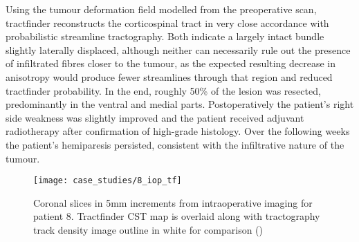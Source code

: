 Using the tumour deformation field modelled from the preoperative scan, tractfinder reconstructs the corticospinal tract in very close accordance with probabilistic streamline tractography.
Both indicate a largely intact bundle slightly laterally displaced, although neither can necessarily rule out the presence of infiltrated fibres closer to the tumour, as the expected resulting decrease in anisotropy would produce fewer streamlines through that region and reduced tractfinder probability.
In the end, roughly 50\% of the lesion was resected, predominantly in the ventral and medial parts.
Postoperatively the patient's right side weakness was slightly improved and the patient received adjuvant radiotherapy  after confirmation of high-grade histology.
Over the following weeks the patient's hemiparesis persisted, consistent with the infiltrative nature of the tumour.

\begin{figure}
  \texttt{[image: case\_studies/8\_iop\_tf]}
  \caption{Coronal slices in 5mm increments from intraoperative imaging for patient 8. Tractfinder CST map is overlaid along with tractography track density image outline in white for comparison ()}
  \label{fig:8i_tf}
\end{figure}
